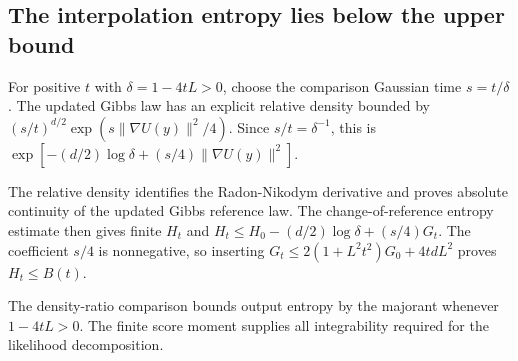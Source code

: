 \documentclass[11pt,a4paper]{report}
\begin{document}
\subsection{\texorpdfstring{The interpolation entropy lies below the upper bound}{The interpolation entropy lies below the upper bound}}
\label{report-step-UnadjustedLangevin-LSI-InitialEntropy-lean-4}


For positive \(t\) with \(\delta=1-4tL>0\), choose the comparison Gaussian time \(s=t/\delta\). The updated Gibbs law has an explicit relative density bounded by \((s/t)^{d/2}\exp(s\|\nabla U(y)\|^2/4)\). Since \(s/t=\delta^{-1}\), this is \(\exp[-(d/2)\log\delta+(s/4)\|\nabla U(y)\|^2]\).



The relative density identifies the Radon-Nikodym derivative and proves absolute continuity of the updated Gibbs reference law. The change-of-reference entropy estimate then gives finite \(H_t\) and \(H_t\le H_0-(d/2)\log\delta+(s/4)G_t\). The coefficient \(s/4\) is nonnegative, so inserting \(G_t\le2(1+L^2t^2)G_0+4tdL^2\) proves \(H_t\le B(t)\).



The density-ratio comparison bounds output entropy by the majorant whenever \(1-4tL>0\). The finite score moment supplies all integrability required for the likelihood decomposition.
\end{document}
